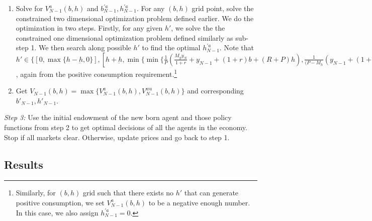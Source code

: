\documentclass[a4paper,10pt]{article}
\begin{document}
\begin{enumerate}
  \item Solve for $V_{N-1}^{a}(b,h)$ and $b^{'a}_{N-1},h^{'a}_{N-1}$. For any $(b,h)$ grid point, solve the constrained two dimensional optimization problem defined earlier. We do the optimization in two steps. Firstly, for any given $h'$, we solve the the constrained one dimensional optimization problem defined similarly as sub-step 1. We then search along possible $h'$ to find the optimal $h^{'a}_{N-1}$. Note that $h'\in\{[0,\max \{h-\underbar{h},0\}],[h+\underbar{h},\min \{ \min \{\frac{1}{P} (\frac{M_y y_N}{1+r}+y_{N-1}+(1+r)b+(R+P)h),\frac{1}{(P-M_h} (y_{N-1}+(1+r)b+(R+P)h)\},h_{max}\}]\}$, again from the positive consumption requirement.\footnote{Similarly, for $(b,h)$ grid such that there exists no $h'$ that can generate positive consumption, we set $V_{N-1}^{a}(b,h)$ to be a negative enough number. In this case, we also assign $h^{'a}_{N-1}=0$.}

  \item Get $V_{N-1}(b,h)=\max \{V_{N-1}^{a}(b,h),V_{N-1}^{wa}(b,h)\}$ and corresponding $b'_{N-1},h'_{N-1}$.
\end{enumerate}
\vspace{2 mm}

\noindent \emph{Step 3:} Use the initial endowment of the new born agent and those policy functions from step 2 to get optimal decisions of all the agents in the economy. Stop if all markets clear. Otherwise, update prices and go back to step 1.


\fi

\pagebreak

\subsection*{Results}
\end{document}
